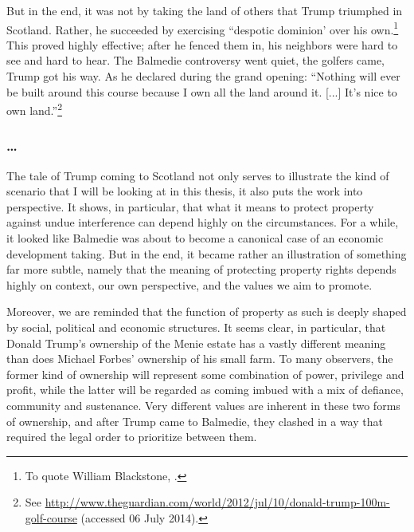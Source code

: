 But in the end, it was not by taking the land of others that Trump triumphed in Scotland. Rather, he succeeded by exercising ``despotic dominion' over his own.\footnote{To quote William Blackstone, \cite[2]{blackstone79b}.} This proved highly effective;  after he fenced them in, his neighbors were hard to see and hard to hear. The Balmedie controversy went quiet, the golfers came, Trump got his way. As he declared during the grand opening: ``Nothing will ever be built around this course because I own all the land around it. [...] It's nice to own land.''\footnote{See \url{http://www.theguardian.com/world/2012/jul/10/donald-trump-100m-golf-course} (accessed 06 July 2014).}

\subsubsection*{\ldots}

The tale of Trump coming to Scotland not only serves to illustrate the kind of scenario that I will be looking at in this thesis, it also puts the work into perspective. It shows, in particular, that what it means to protect property against undue interference can depend highly on the circumstances. For a while, it looked like Balmedie was about to become a canonical case of an economic development taking. But in the end, it became rather an illustration of something far more subtle, namely that the meaning of protecting property rights depends highly on context, our own perspective, and the values we aim to promote. 

Moreover, we are reminded that the function of property as such is deeply shaped by social, political and economic structures. It seems clear, in particular, that Donald Trump's ownership of the Menie estate has a vastly different meaning than does Michael Forbes' ownership of his small farm. To many observers, the former kind of ownership will represent some combination of power, privilege and profit, while the latter will be regarded as coming imbued with a mix of defiance, community and sustenance. Very different values are inherent in these two forms of ownership, and after Trump came to Balmedie, they clashed in a way that required the legal order to prioritize between them.

